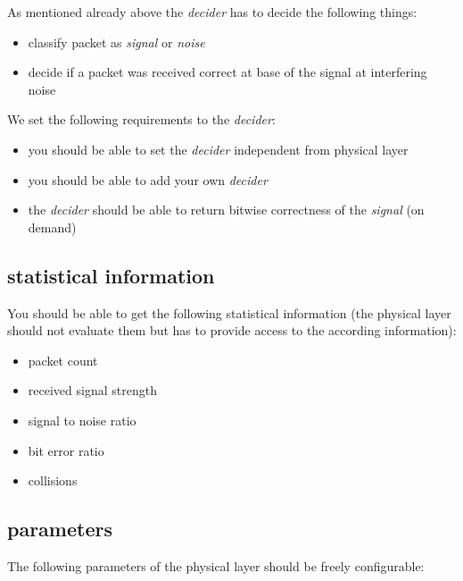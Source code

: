 As mentioned already above the \textit{decider} has to decide the following things:

\begin{itemize}
\item classify packet as \textit{signal} or \textit{noise}
\item decide if a packet was received correct at base of the signal at interfering noise
\end{itemize}

We set the following requirements to the \textit{decider}:

\begin{itemize}
 \item you should be able to set the \textit{decider} independent from physical layer
 \item you should be able to add your own \textit{decider}
 \item the \textit{decider} should be able to return bitwise correctness of the \textit{signal} (on demand)
\end{itemize}


\subsection{statistical information}
\label{statistic}

You should be able to get the following statistical information (the physical layer should not evaluate them but has to provide access to the according information):

\begin{itemize}
\item packet count
\item received signal strength
\item signal to noise ratio
\item bit error ratio
\item collisions
\end{itemize}

\subsection{parameters}
\label{parameters}

The following parameters of the physical layer should be freely configurable:

